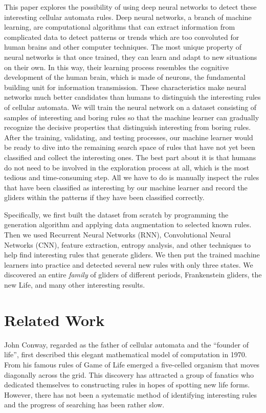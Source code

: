 \documentclass[12pt]{article}
\numberwithin{figure}{section} %
\begin{document}
This paper explores the possibility of using deep neural networks to detect these interesting cellular automata rules. Deep neural networks, a branch of machine learning, are computational algorithms that can extract information from complicated data to detect patterns or trends which are too convoluted for human brains and other computer techniques. The most unique property of neural networks is that once trained, they can learn and adapt to new situations on their own. In this way, their learning process resembles the cognitive development of the human brain, which is made of neurons, the fundamental building unit for information transmission. These characteristics make neural networks much better candidates than humans to distinguish the interesting rules of cellular automata. We will train the neural network on a dataset consisting of samples of interesting and boring rules so that the machine learner can gradually recognize the decisive properties that distinguish interesting from boring rules. After the training, validating, and testing processes, our machine learner would be ready to dive into the remaining search space of rules that have not yet been classified and collect the interesting ones. The best part about it is that humans do not need to be involved in the exploration process at all, which is the most tedious and time-consuming step. All we have to do is manually inspect the rules that have been classified as interesting by our machine learner and record the gliders within the patterns if they have been classified correctly. 

Specifically, we first built the dataset from scratch by programming the generation algorithm and applying data augmentation to selected known rules. Then we used Recurrent Neural Networks (RNN), Convolutional Neural Networks (CNN), feature extraction, entropy analysis, and other techniques to help find interesting rules that generate gliders. We then put the trained machine learners into practice and detected several new rules with only three states. We discovered an entire \textit{family} of gliders of different periods, Frankenstein gliders, the new Life, and many other interesting results.

\newpage
\section{Related Work}
\label{Related Work}
John Conway, regarded as the father of cellular automata and the “founder of life”, first described this elegant mathematical model of computation in 1970. From his famous rules of Game of Life emerged a five-celled organism that moves diagonally across the grid. This discovery has attracted a group of fanatics who dedicated themselves to constructing rules in hopes of spotting new life forms. However, there has not been a systematic method of identifying interesting rules and the progress of searching has been rather slow. 
\end{document}
